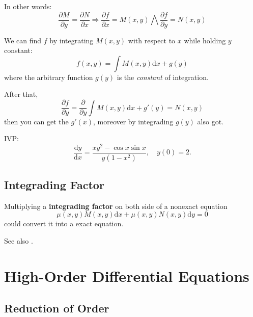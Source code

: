 In other words:
\[
    \dfrac{\partial M}{\partial y} = \dfrac{\partial N}{\partial x}  
    \Longrightarrow 
    \dfrac{\partial f}{\partial x} = M(x, y) 
    \bigwedge
    \dfrac{\partial f}{\partial y} = N(x, y) 
\]

We can find $f$ by integrating $M(x, y)$ 
with respect to $x$ while holding $y$ constant:
\[
    f(x, y) = \int M(x, y) \mathrm{d}x + g(y)
\]
where the arbitrary function $g(y)$ is the \emph{constant} of integration. 

After that, 
\[
    \dfrac{\partial f}{\partial y} = \dfrac{\partial}{\partial y}
    \int M(x, y) \mathrm{d}x + g'(y) = N(x, y)
\]
then you can get the $g'(x)$, moreover by integrading $g(y)$ also got.

\begin{example}
    IVP:
    \[
        \dfrac{\mathrm{d}y}{\mathrm{d}x} = 
        \dfrac{xy^2 - \cos x \sin x}{y(1-x^2)}, \quad y(0) = 2.
    \]
    \cite[page 68]{fcde}
\end{example}

\subsection{Integrading Factor}

Multiplying a \textbf{integrading factor} on both side of a nonexact equation
\[
    \mu (x, y) M(x, y) \mathrm{d}x + \mu (x, y) N(x, y) \mathrm{d}y = 0
\]
could convert it into a exact equation.

See also \cite[page 68]{fcde}.

\section{High-Order Differential Equations}

\subsection{Reduction of Order} \label{reduction-of-order}

